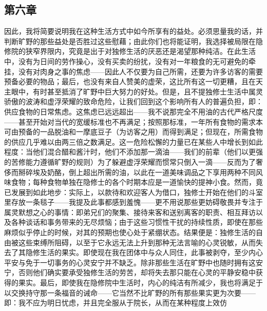 
\subsection{第六章}

\par

因此，我将简要说明我在这种生活方式中如今所享有的益处。\newline{}必须思量我的话，并判断旷野的那些益处是否胜过这些慰藉；由此你们也将能证明，我选择被局限在隐修院的狭窄界限内，究竟是出于对独修生活的厌恶还是渴望那种纯洁。\newline{}在此生活中，没有为日间的劳作操心，没有买卖的纷扰，没有对一年粮食的无可避免的牵挂，没有对肉身之事的焦虑——因此人不仅要为自己所需，还要为许多访客的需要预备必要的物品；最后，也没有来自人赞美的虚荣，这比所有这一切更糟，且在天主眼中，有时甚至抵消了旷野中巨大努力的好处。\newline{}但是，且不提独修士生活中属灵骄傲的波涛和虚浮荣耀的致命危险，让我们回到这个影响所有人的普遍负担，即：供应食物的日常焦虑。这焦虑已远远超出——我不说那完全不用油的古代严格尺度——甚至开始对当代的宽缓标准也不再满足；按照那标准，一年所有食物的需求本可由预备的一品脱油和一摩底豆子（为访客之用）而得到满足；但现在，所需食物的供应几乎难以由两三倍之数满足。\newline{}这一危险松懈的力量已在某些人中增长到如此程度：当他们混合醋和酱汁时，他们不添加那一滴油——我们的前辈（他们以更强的苦修能力遵循旷野的规则）为了躲避虚浮荣耀而惯常只倒入一滴——反而为了奢侈而掰碎埃及奶酪，倒上超出所需的油，以此在一道美味调品之下享用两种不同风味食物；每种食物单独在隐修士的各个时期本应是一道愉快的提神小食。\newline{}然而，竟已发展到如此地步：实际上，以款待和欢迎客人为借口，独修士开始在他们的斗室里存放一条毯子——我提及此事都感到羞愧——更不用说那些更妨碍敬畏并专注于属灵默想之心的事情：即弟兄们的聚集、接待来客和送别离客的职责、相互拜访以及各种谈话和事务带来的无尽烦恼；由于这些习惯性干扰的持续性质，即使在那些麻烦似乎停止的时候，对其的预期也使心处于紧绷状态。\newline{}结果便是：独修生活的自由被这些束缚所阻碍，以至于它永远无法上升到那种无法言喻的心灵锐敏，从而失去了其隐修生活的果实。\newline{}即使现在我在团体中与众人同住，此事被剥夺，至少内心平安与免于一切事务的心灵安宁并不缺乏。\newline{}除非那些生活在旷野中也随时拥有这安宁，否则他们确实要承受独修生活的劳苦，却将失去那只能在心灵的平静安稳中获得的果实。\newline{}最后，即使我在隐修院中生活时，内心的纯洁有所减少，我也将满足于以交换持守那一条福音的诫命——它当然不比旷野的所有那些果实更为次要——即：我不应为明日忧虑，并且完全服从于院长，从而在某种程度上效仿\par

